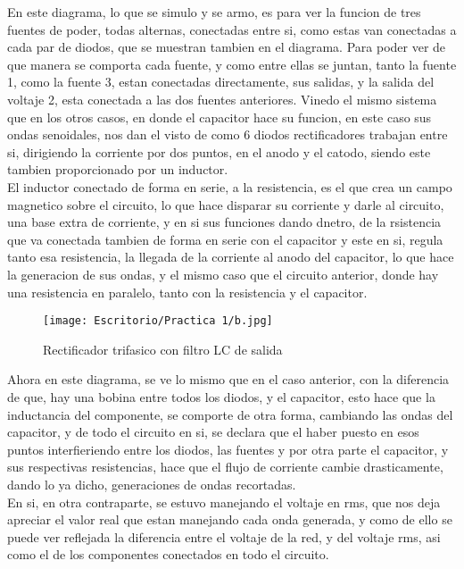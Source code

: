 \documentclass[11pt,a4paper]{article}
\begin{document}
\begin{enumerate}
  
En este diagrama, lo que se simulo y se armo, es para ver la funcion de tres fuentes de poder, todas alternas, conectadas entre si, como estas van conectadas a cada par de diodos, que se muestran tambien en el diagrama. Para poder ver de que manera se comporta cada fuente, y como entre ellas se juntan, tanto la fuente 1, como la fuente 3, estan conectadas directamente, sus salidas, y la salida del voltaje 2, esta conectada a las dos fuentes anteriores.
Vinedo el mismo sistema que en los otros casos, en donde el capacitor hace su funcion, en este caso sus ondas senoidales, nos dan el visto de como 6 diodos rectificadores trabajan entre si, dirigiendo la corriente por dos puntos, en el anodo y el catodo, siendo este tambien proporcionado por un inductor.\\
El inductor conectado de forma en serie, a la resistencia, es el que crea un campo magnetico sobre el circuito, lo que hace disparar su corriente y darle al circuito, una base extra de corriente, y en si sus funciones dando dnetro, de la rsistencia que va conectada tambien de forma en serie con el capacitor y este en si, regula tanto esa resistencia, la llegada de la corriente al anodo del capacitor, lo que hace la generacion de sus ondas, y el mismo caso que el circuito anterior, donde hay una resistencia en paralelo, tanto con la resistencia y el capacitor. 
  
 \begin{figure}[hbtp]
 \centering
 \texttt{[image: Escritorio/Practica 1/b.jpg]}
 \caption{Rectificador trifasico con filtro LC de salida}
 \end{figure}
 
  
Ahora en este diagrama, se ve lo mismo que en el caso anterior, con la diferencia de que, hay una bobina entre todos los diodos, y el capacitor, esto hace que la inductancia del componente, se comporte de otra forma, cambiando las ondas del capacitor, y de todo el circuito en si, se declara que el haber puesto en esos puntos interfieriendo entre los diodos, las fuentes y por otra parte el capacitor, y sus respectivas resistencias, hace que el flujo de corriente cambie drasticamente, dando lo ya dicho, generaciones de ondas recortadas.\\
En si, en otra contraparte, se estuvo manejando el voltaje en rms, que nos deja apreciar el valor real que estan manejando cada onda generada, y como de ello se puede ver reflejada la diferencia entre el voltaje de la red, y del voltaje rms, asi como el de los componentes conectados en todo el circuito.
  

\end{enumerate}
\end{document}
